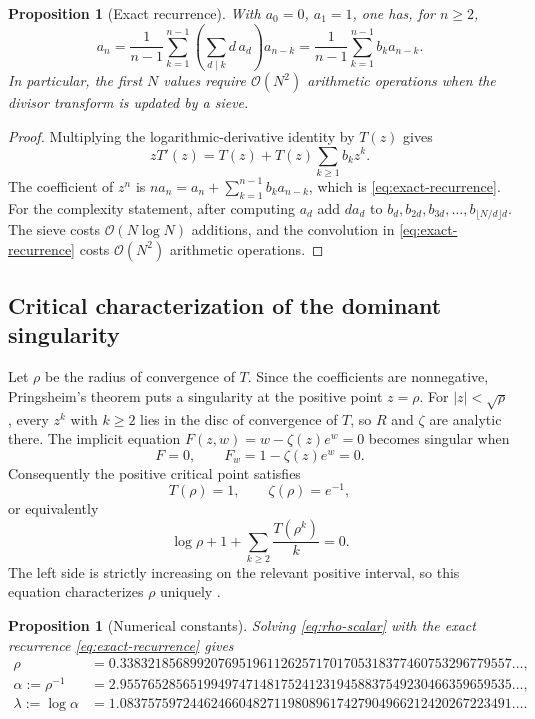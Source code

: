 \documentclass[11pt,oneside]{article}
\numberwithin{equation}{section}
\theoremstyle{plain}
\newtheorem{proposition}[theorem]{Proposition}
\theoremstyle{definition}
\theoremstyle{remark}
\newcommand{\Ord}{\mathcal O}
\begin{document}
\begin{proposition}[Exact recurrence]\label{prop:exact-recurrence}
With $a_0=0$, $a_1=1$, one has, for $n\ge2$,
\begin{equation}\label{eq:exact-recurrence}
 a_n=\frac1{n-1}\sum_{k=1}^{n-1}
 \left(\sum_{d\mid k}d\,a_d\right)a_{n-k}
 =\frac1{n-1}\sum_{k=1}^{n-1}b_ka_{n-k}.
\end{equation}
In particular, the first $N$ values require $\Ord(N^2)$ arithmetic
operations when the divisor transform is updated by a sieve.
\end{proposition}

\begin{proof}
Multiplying the logarithmic-derivative identity by $T(z)$ gives
\[
 zT'(z)=T(z)+T(z)\sum_{k\ge1}b_kz^k.
\]
The coefficient of $z^n$ is
$n a_n=a_n+\sum_{k=1}^{n-1}b_ka_{n-k}$, which is
\eqref{eq:exact-recurrence}.  For the complexity statement, after computing
$a_d$ add $d a_d$ to $b_d,b_{2d},b_{3d},\ldots,b_{\lfloor N/d\rfloor d}$.
The sieve costs $\Ord(N\log N)$ additions, and the convolution in
\eqref{eq:exact-recurrence} costs $\Ord(N^2)$ arithmetic operations.
\end{proof}

\subsection{Critical characterization of the dominant singularity}

Let $\rho$ be the radius of convergence of $T$.  Since the coefficients are
nonnegative, Pringsheim's theorem puts a singularity at the positive point
$z=\rho$.  For $|z|<\sqrt\rho$, every $z^k$ with $k\ge2$ lies in the disc of
convergence of $T$, so $R$ and $\zeta$ are analytic there.  The implicit
equation $F(z,w)=w-\zeta(z)e^w=0$ becomes singular when
\[
 F=0,\qquad F_w=1-\zeta(z)e^w=0.
\]
Consequently the positive critical point satisfies
\begin{equation}\label{eq:critical-system}
 T(\rho)=1,\qquad \zeta(\rho)=e^{-1},
\end{equation}
or equivalently
\begin{equation}\label{eq:rho-scalar}
 \log\rho+1+\sum_{k\ge2}\frac{T(\rho^k)}{k}=0.
\end{equation}
The left side is strictly increasing on the relevant positive interval, so
this equation characterizes $\rho$ uniquely
\cite{Otter1948,FlajoletSedgewick2009,Genitrini2016}.

\begin{proposition}[Numerical constants]\label{prop:numerical-constants}
Solving \eqref{eq:rho-scalar} with the exact recurrence
\eqref{eq:exact-recurrence} gives
\begin{align}
 \rho&=0.33832185689920769519611262571701705318377460753296779557\ldots,
 \label{eq:rho-numeric}\\
 \alpha:=\rho^{-1}
 &=2.95576528565199497471481752412319458837549230466359659535\ldots,
 \label{eq:alpha-numeric}\\
 \lambda:=\log\alpha
 &=1.08375759724462466048271198089617427904966212420267223491\ldots.
 \label{eq:lambda-numeric}
\end{align}
\end{proposition}
\end{document}
